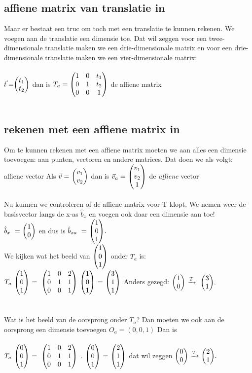 \subsection{affiene  matrix van translatie in \RT}
Maar er bestaat een truc om  toch met een translatie te kunnen rekenen. We voegen aan de translatie een dimensie toe. Dat wil zeggen voor een twee-dimensionale translatie maken we een drie-dimensionale matrix en voor een drie-dimensionale translatie maken we een  vier-dimensionale matrix:\\ \\ 
 { $\vec{t} = \vectweesnel{t} $  \quad  dan is 
	$ T_a = \begin{pmatrix}  1 & 0 & t_1  \\  0 & 1 & t_2  \\ 0 & 0 & 1  \end{pmatrix} $ \quad de affiene matrix  } \\ \\
\subsection{rekenen met een affiene  matrix in \RT}
Om te kunnen rekenen met een affiene matrix moeten we aan alles een dimensie toevoegen: aan punten, vectoren en andere matrices. Dat doen we als volgt: 
\mydef
{affiene vector \RT}{Als  $\vec{v} = \ \vectweesnel{v} $ dan  is 
	$\vec{v}_a = \  \vecdrie{v_1}{v_2}{1}  $ \quad de \textit{affiene} vector } \\
 \\
Nu kunnen we  controleren of de affiene matrix voor\textit{ }T klopt. We nemen weer de basisvector langs de x-as $ \hat{b}_x $ en voegen ook daar een dimensie aan toe! \\
$ \hat{b}_x \ = \ \vectwee{1}{0} $ en dus is  
$ \hat{b}_{xa} \ = \  \vecdrie{1}{0}{1}. $ \\
We kijken wat het beeld van $ \vecdrie{1}{0}{1} $ onder \textit{$ T_a $} is: \\
$ T_a \ \vecdrie{1}{0}{1} \ 
= \ \matdrie{ 1 & 0 &  2 }{ 0 & 1 & 1 }{0 & 0 & 1 }  \ \vecdrie{1}{0}{1} \ 
=  \ \vecdrie{3}{1}{1} $  
\quad  Anders gezegd: \quad $ \vectwee{1}{0}  \  \xrightarrow{T}   \ \   \vectwee{ 3 } {1}. $\\ \\ \\
Wat is het beeld van de oorsprong onder \textit{$  T_a $}? Dan moeten we ook aan de oorsprong een dimensie toevoegen $ O_a = (0,0,1) $ Dan is \\ \\
$ T_a \ \vecdrie{0}{0}{1} \ 
= \ \matdrie{ 1 & 0 &  2 }{ 0 & 1 & 1 }{0 & 0 & 1 }  \ . \ \vecdrie{0}{0}{1} \ 
=  \ \vecdrie{2}{1}{1} $ 
\quad dat wil zeggen \quad
$ \vectwee{0}{0}  \  \xrightarrow{T}   \   \vectwee{ 2 } {1}. $\\

